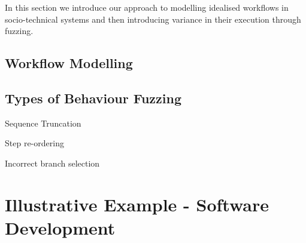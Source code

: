 \documentclass[11pt, twocolumn]{article}
\begin{document}
In this section we introduce our approach to modelling idealised workflows in
socio-technical systems and then introducing variance in their execution through
fuzzing.


\subsection{Workflow Modelling}




\subsection{Types of Behaviour Fuzzing}


Sequence Truncation

Step re-ordering

Incorrect branch selection


\section{Illustrative Example - Software Development}


\printbibliography

\end{document}
